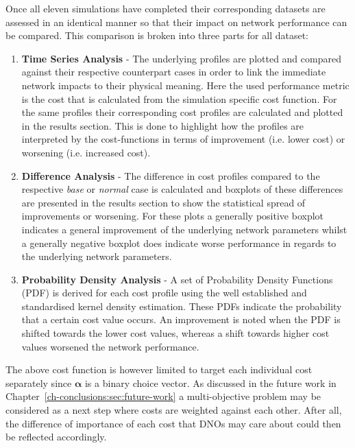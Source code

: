 Once all eleven simulations have completed their corresponding datasets are assessed in an identical manner so that their impact on network performance can be compared.
This comparison is broken into three parts for all dataset:

\begin{enumerate}
	\item \textbf{Time Series Analysis} - 
	The underlying profiles are plotted and compared against their respective counterpart cases in order to link the immediate network impacts to their physical meaning.
	Here the used performance metric is the cost that is calculated from the simulation specific cost function.
	For the same profiles their corresponding cost profiles are calculated and plotted in the results section.
	This is done to highlight how the profiles are interpreted by the cost-functions in terms of improvement (i.e. lower cost) or worsening (i.e. increased cost).
	\item \textbf{Difference Analysis} - 
	The difference in cost profiles compared to the respective \textit{base} or \textit{normal} case is calculated and boxplots of these differences are presented in the results section to show the statistical spread of improvements or worsening.
	For these plots a generally positive boxplot indicates a general improvement of the underlying network parameters whilst a generally negative boxplot does indicate worse performance in regards to the underlying network parameters.
	\item \textbf{Probability Density Analysis} - 
	A set of Probability Density Functions (PDF) is derived for each cost profile using the well established and standardised kernel density estimation.
	These PDFs indicate the probability that a certain cost value occurs.
	An improvement is noted when the PDF is shifted towards the lower cost values, whereas a shift towards higher cost values worsened the network performance.
\end{enumerate}

The above cost function is however limited to target each individual cost separately since $\boldsymbol{\alpha}$ is a binary choice vector.
As discussed in the future work in Chapter~\ref{ch-conclusions:sec:future-work} a multi-objective problem may be considered as a next step where costs are weighted against each other.
After all, the difference of importance of each cost that DNOs may care about could then be reflected accordingly.




